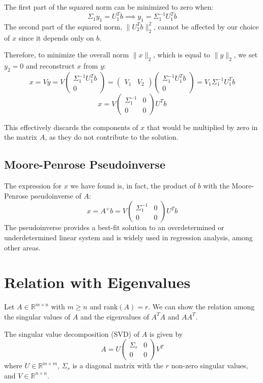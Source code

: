 \documentclass[a4paper, 12pt]{article}
\begin{document}
The first part of the squared norm can be minimized to zero when:
\[
\Sigma_1 y_1 = U_1^T b \implies y_1 = \Sigma_1^{-1} U_1^T b
\]
The second part of the squared norm, $\| U_2^T b \|_2^2$, cannot be affected by our choice of $x$ since it depends only on $b$. 

Therefore, to minimize the overall norm $\| x \|_2$, which is equal to $\| y \|_2$, we set $y_2 = 0$ and reconstruct $x$ from $y$:
\[ x = Vy = V\begin{pmatrix} \Sigma_1^{-1} U_1^T b \\ 0 \end{pmatrix} = \begin{pmatrix} V_1 & V_2 \end{pmatrix} \begin{pmatrix} \Sigma_1^{-1} U_1^T b \\ 0 \end{pmatrix} = V_1 \Sigma_1^{-1} U_1^T b \]
\[ x = V \begin{pmatrix} \Sigma_1^{-1} & 0 \\ 0 & 0 \end{pmatrix} U^T b \]

This effectively discards the components of $x$ that would be multiplied by zero in the matrix $A$, as they do not contribute to the solution.

\subsection*{Moore-Penrose Pseudoinverse}
The expression for $x$ we have found is, in fact, the product of $b$ with the Moore-Penrose pseudoinverse of $A$:
\[
x = A^+ b = V \begin{pmatrix} \Sigma_1^{-1} & 0 \\ 0 & 0 \end{pmatrix} U^T b
\]
The pseudoinverse provides a best-fit solution to an overdetermined or underdetermined linear system and is widely used in regression analysis, among other areas.

\section{Relation with Eigenvalues}

Let $ A \in \mathbb{R}^{m \times n} $ with $ m \geq n $ and rank$(A) = r$. We can show the relation among the singular values of $A$ and the eigenvalues of $A^TA$ and $AA^T$.

The singular value decomposition (SVD) of $A$ is given by
\[ A = U \begin{pmatrix}
\Sigma_r & 0 \\
0 & 0 
\end{pmatrix} V^T \]
where $ U \in \mathbb{R}^{m \times m} $, $\Sigma_r$ is a diagonal matrix with the $r$ non-zero singular values, and $ V \in \mathbb{R}^{n \times n} $.
\end{document}
